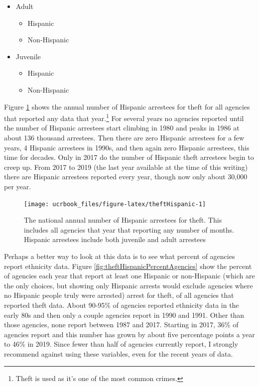 \documentclass[
  12pt,
  openany]{book}
\providecommand{\tightlist}{%
  \setlength{\itemsep}{0pt}\setlength{\parskip}{0pt}}
\begin{document}
\begin{itemize}
\tightlist
\item
  Adult

  \begin{itemize}
  \tightlist
  \item
    Hispanic
  \item
    Non-Hispanic
  \end{itemize}
\item
  Juvenile

  \begin{itemize}
  \tightlist
  \item
    Hispanic
  \item
    Non-Hispanic
  \end{itemize}
\end{itemize}

Figure \ref{fig:theftHispanic} shows the annual number of Hispanic arrestees for theft for all agencies that reported any data that year.\footnote{Theft is used as it's one of the most common crimes.} For several years no agencies reported until the number of Hispanic arrestees start climbing in 1980 and peaks in 1986 at about 136 thousand arrestees. Then there are zero Hispanic arrestees for a few years, 4 Hispanic arrestees in 1990s, and then again zero Hispanic arrestees, this time for decades. Only in 2017 do the number of Hispanic theft arrestees begin to creep up. From 2017 to 2019 (the last year available at the time of this writing) there are Hispanic arrestees reported every year, though now only about 30,000 per year.

\begin{figure}

{\centering \texttt{[image: ucrbook\_files/figure-latex/theftHispanic-1]} 

}

\caption{The national annual number of Hispanic arrestees for theft. This includes all agencies that year that reporting any number of months. Hispanic arrestees include both juvenile and adult arrestees}\label{fig:theftHispanic}
\end{figure}

Perhaps a better way to look at this data is to see what percent of agencies report ethnicity data. Figure \ref{fig:theftHispanicPercentAgencies} show the percent of agencies each year that report at least one Hispanic or non-Hispanic (which are the only choices, but showing only Hispanic arrests would exclude agencies where no Hispanic people truly were arrested) arrest for theft, of all agencies that reported theft data. About 90-95\% of agencies reported ethnicity data in the early 80s and then only a couple agencies report in 1990 and 1991. Other than those agencies, none report between 1987 and 2017. Starting in 2017, 36\% of agencies report and this number has grown by about five percentage points a year to 46\% in 2019. Since fewer than half of agencies currently report, I strongly recommend against using these variables, even for the recent years of data.
\end{document}
